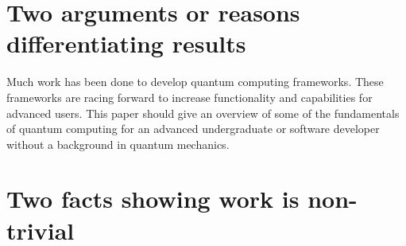 \documentclass{article}
\begin{document}
\section{Two arguments or reasons differentiating results}
Much work has been done to develop quantum computing frameworks. These frameworks are racing forward to increase functionality and capabilities for advanced users. This paper should give an overview of some of the fundamentals of quantum computing for an advanced undergraduate or software developer without a background in quantum mechanics.

\section{Two facts showing work is non-trivial}
\end{document}

